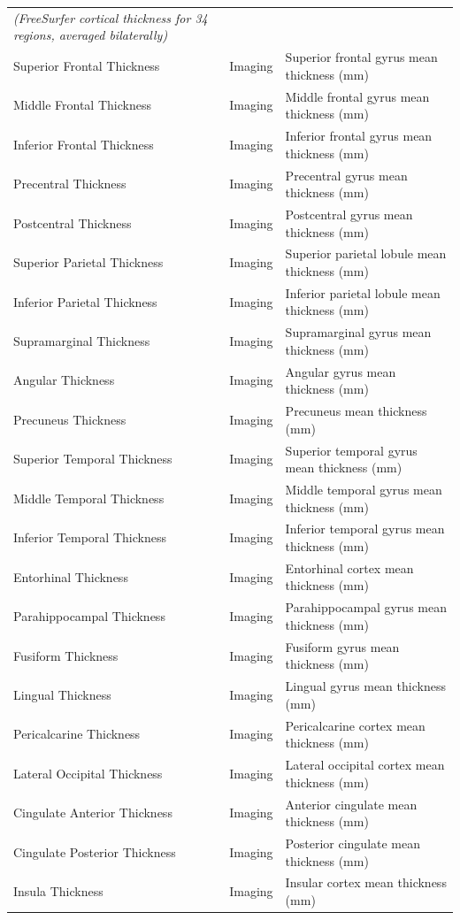 \documentclass[11pt]{article}
\begin{document}
\begin{longtable}{p{} p{} p{}}
\textit{(FreeSurfer cortical thickness for 34 regions, averaged bilaterally)} & & \\
Superior Frontal Thickness & Imaging & Superior frontal gyrus mean thickness (mm) \\
Middle Frontal Thickness & Imaging & Middle frontal gyrus mean thickness (mm) \\
Inferior Frontal Thickness & Imaging & Inferior frontal gyrus mean thickness (mm) \\
Precentral Thickness & Imaging & Precentral gyrus mean thickness (mm) \\
Postcentral Thickness & Imaging & Postcentral gyrus mean thickness (mm) \\
Superior Parietal Thickness & Imaging & Superior parietal lobule mean thickness (mm) \\
Inferior Parietal Thickness & Imaging & Inferior parietal lobule mean thickness (mm) \\
Supramarginal Thickness & Imaging & Supramarginal gyrus mean thickness (mm) \\
Angular Thickness & Imaging & Angular gyrus mean thickness (mm) \\
Precuneus Thickness & Imaging & Precuneus mean thickness (mm) \\
Superior Temporal Thickness & Imaging & Superior temporal gyrus mean thickness (mm) \\
Middle Temporal Thickness & Imaging & Middle temporal gyrus mean thickness (mm) \\
Inferior Temporal Thickness & Imaging & Inferior temporal gyrus mean thickness (mm) \\
Entorhinal Thickness & Imaging & Entorhinal cortex mean thickness (mm) \\
Parahippocampal Thickness & Imaging & Parahippocampal gyrus mean thickness (mm) \\
Fusiform Thickness & Imaging & Fusiform gyrus mean thickness (mm) \\
Lingual Thickness & Imaging & Lingual gyrus mean thickness (mm) \\
Pericalcarine Thickness & Imaging & Pericalcarine cortex mean thickness (mm) \\
Lateral Occipital Thickness & Imaging & Lateral occipital cortex mean thickness (mm) \\
Cingulate Anterior Thickness & Imaging & Anterior cingulate mean thickness (mm) \\
Cingulate Posterior Thickness & Imaging & Posterior cingulate mean thickness (mm) \\
Insula Thickness & Imaging & Insular cortex mean thickness (mm) \\


\end{longtable}
\end{document}
